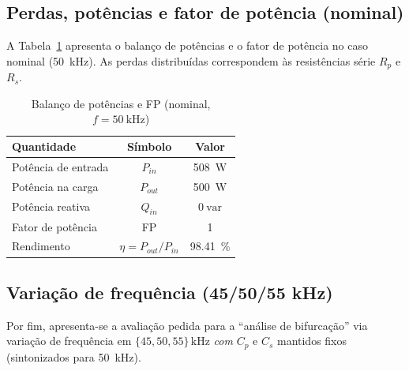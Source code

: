 \documentclass[conference]{IEEEtran}
\begin{document}
\subsection{Perdas, potências e fator de potência (nominal)}
A Tabela~\ref{tab:potencias_nominal} apresenta o balanço de potências e o fator de potência no caso nominal (\SI{50}{\kilo\hertz}). As perdas distribuídas correspondem às resistências série $R_p$ e $R_s$.
\begin{table}[H]
  \caption{Balanço de potências e FP (nominal, $f=\SI{50}{\kilo\hertz}$)\footnotesize}
  \label{tab:potencias_nominal}
  \centering
  \begin{tabular}{lcc}
    \toprule
    Quantidade & Símbolo & Valor \\
    \midrule
    Potência de entrada & $P_{in}$ & \SI{508}{\watt} \\
    Potência na carga & $P_{out}$ & \SI{500}{\watt} \\
    Potência reativa & $Q_{in}$ & $0~\mathrm{var}$ \\
    Fator de potência & FP & \num{1} \\
    Rendimento & $\eta=P_{out}/P_{in}$ & \SI{98.41}{\percent} \\
    \bottomrule
  \end{tabular}
\end{table}

\subsection{Variação de frequência (45/50/55 kHz)}
Por fim, apresenta-se a avaliação pedida para a “análise de bifurcação” via variação de frequência em $\{45,50,55\}\,\si{\kilo\hertz}$ \emph{com} $C_p$ e $C_s$ mantidos fixos (sintonizados para \SI{50}{\kilo\hertz}).
\begin{table}[H]
  \caption{Variação de frequência}
  \label{tab:freq_variacao}
  \centering
  \scriptsize
  \setlength{\tabcolsep}{3pt}
  \renewcommand{\arraystretch}{1.15}
\end{table}
\end{document}

